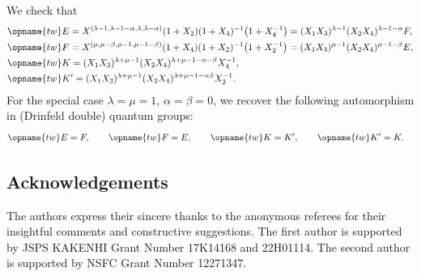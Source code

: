 \documentclass[pdftex]{sigma}
\renewcommand{\tw}{\opname{tw}}
\renewcommand{\tw}{\opname{tw}}
\numberwithin{equation}{section}
\begin{document}
\begin{Example}
We check that
\begin{align*}
&\tw E =X^{(\lambda-1,\lambda-1-\alpha,\lambda,\lambda-\alpha)}(1+X_{2})(1+X_{4})^{-1}\big(1+X_{4}^{-1}\big)=(X_{1}X_{3})^{\lambda-1}(X_{2}X_{4})^{\lambda-1-\alpha}F,\\
&\tw F =X^{(\mu,\mu-\beta,\mu-1,\mu-1-\beta)}(1+X_{4})(1+X_{2})^{-1}\big(1+X_{2}^{-1}\big)=(X_{1}X_{3})^{\mu-1}(X_{2}X_{4})^{\mu-1-\beta}E,\\
&\tw K =(X_{1}X_{3})^{\lambda+\mu-1}(X_{2}X_{4})^{\lambda+\mu-1-\alpha-\beta}X_{4}^{-1},\\
&\tw K' =(X_{1}X_{3})^{\lambda+\mu-1}(X_{2}X_{4})^{\lambda+\mu-1-\alpha\beta}X_{2}^{-1}.
\end{align*}
For the special case $\lambda=\mu=1$, $\alpha=\beta=0$, we recover
the following automorphism in (Drinfeld double) quantum groups:
\begin{align*}
\tw E & =F,\qquad
\tw F =E,\qquad
\tw K =K',\qquad
\tw K' =K.
\end{align*}
\end{Example}

\subsection*{Acknowledgements}

The authors express their sincere thanks to the anonymous referees for their insightful comments and constructive suggestions. The first author is supported by JSPS KAKENHI Grant Number 17K14168 and 22H01114. The second author is supported by NSFC Grant Number 12271347.
\end{document}
